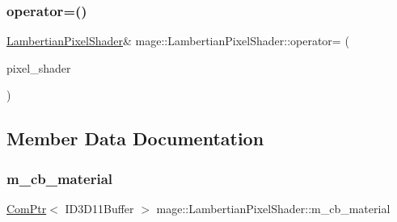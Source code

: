 \subsubsection{\texorpdfstring{operator=()}{operator=()}\hspace{0.1cm}{\footnotesize\ttfamily [2/2]}}
{\footnotesize\ttfamily \hyperlink{classmage_1_1_lambertian_pixel_shader}{Lambertian\+Pixel\+Shader}\& mage\+::\+Lambertian\+Pixel\+Shader\+::operator= (\begin{DoxyParamCaption}\item[{\hyperlink{classmage_1_1_lambertian_pixel_shader}{Lambertian\+Pixel\+Shader} \&\&}]{pixel\+\_\+shader }\end{DoxyParamCaption})\hspace{0.3cm}{\ttfamily [delete]}}



\subsection{Member Data Documentation}
\hypertarget{classmage_1_1_lambertian_pixel_shader_aff89982b5f85531515ec2316930b2944}{}\label{classmage_1_1_lambertian_pixel_shader_aff89982b5f85531515ec2316930b2944} 
\subsubsection{\texorpdfstring{m\+\_\+cb\+\_\+material}{m\_cb\_material}}
{\footnotesize\ttfamily \hyperlink{namespacemage_ae74f374780900893caa5555d1031fd79}{Com\+Ptr}$<$ I\+D3\+D11\+Buffer $>$ mage\+::\+Lambertian\+Pixel\+Shader\+::m\+\_\+cb\+\_\+material\hspace{0.3cm}{\ttfamily [private]}}

